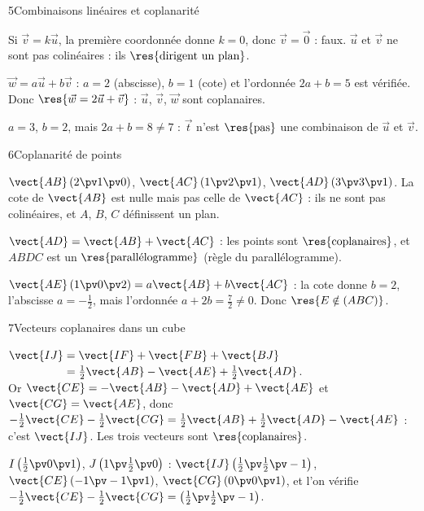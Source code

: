 \begin{deuxcolonnes}
\begin{corrige}{5}{Combinaisons linéaires et coplanarité}
\begin{questions}
  \item Si $\vec v=k\vec u$, la première coordonnée donne $k=0$, donc $\vec v=\vec0$ : faux. $\vec u$ et $\vec v$ ne sont pas
    colinéaires : ils $\res{\text{dirigent un plan}}$.
  \item $\vec w=a\vec u+b\vec v$ : $a=2$ (abscisse), $b=1$ (cote) et l'ordonnée $2a+b=5$ est vérifiée. Donc
    $\res{\vec w=2\vec u+\vec v}$ : $\vec u$, $\vec v$, $\vec w$ sont coplanaires.
  \item $a=3$, $b=2$, mais $2a+b=8\neq7$ : $\vec t$ n'est $\res{\text{pas}}$ une combinaison de $\vec u$ et $\vec v$.
\end{questions}
\end{corrige}

\begin{corrige}{6}{Coplanarité de points}
\begin{questions}
  \item $\vect{AB}\,(2\pv1\pv0)$, $\vect{AC}\,(1\pv2\pv1)$, $\vect{AD}\,(3\pv3\pv1)$. La cote de $\vect{AB}$ est nulle mais pas
    celle de $\vect{AC}$ : ils ne sont pas colinéaires, et $A$, $B$, $C$ définissent un plan.
  \item $\vect{AD}=\vect{AB}+\vect{AC}$ : les points sont $\res{\text{coplanaires}}$, et $ABDC$ est un
    $\res{\text{parallélogramme}}$ (règle du parallélogramme).
  \item $\vect{AE}\,(1\pv0\pv2)=a\vect{AB}+b\vect{AC}$ : la cote donne $b=2$, l'abscisse $a=-\frac12$, mais l'ordonnée
    $a+2b=\frac72\neq0$. Donc $\res{E\notin(ABC)}$.
\end{questions}
\end{corrige}

\begin{corrige}{7}{Vecteurs coplanaires dans un cube}
\begin{questions}
  \item $\vect{IJ}=\vect{IF}+\vect{FB}+\vect{BJ}$\\ $\phantom{\vect{IJ}}=\frac12\vect{AB}-\vect{AE}+\frac12\vect{AD}$.\\
    Or $\vect{CE}=-\vect{AB}-\vect{AD}+\vect{AE}$ et $\vect{CG}=\vect{AE}$, donc\\
    $-\frac12\vect{CE}-\frac12\vect{CG}=\frac12\vect{AB}+\frac12\vect{AD}-\vect{AE}$ :\\
    c'est $\vect{IJ}$. Les trois vecteurs sont $\res{\text{coplanaires}}$.
  \item $I\left(\frac12\pv0\pv1\right)$, $J\left(1\pv\frac12\pv0\right)$ : $\vect{IJ}\left(\frac12\pv\frac12\pv-1\right)$,
    $\vect{CE}\,(-1\pv-1\pv1)$, $\vect{CG}\,(0\pv0\pv1)$, et l'on vérifie
    $-\frac12\vect{CE}-\frac12\vect{CG}=\left(\frac12\pv\frac12\pv-1\right)$.
\end{questions}
\end{corrige}


\end{deuxcolonnes}
